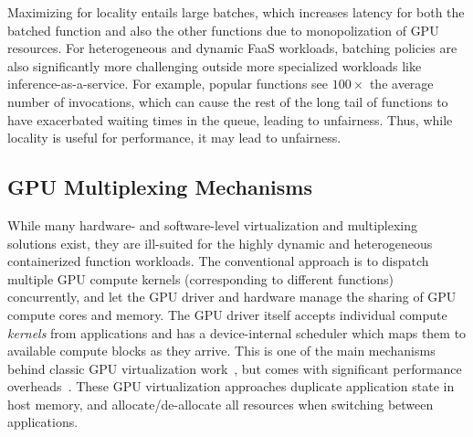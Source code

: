 Maximizing for locality entails large batches, which increases latency for both the batched function and also the other functions due to monopolization of GPU resources.  
For heterogeneous and dynamic FaaS workloads, batching policies are also significantly more challenging outside more specialized workloads like inference-as-a-service.
For example, popular functions see $100\times$ the average number of invocations, which can cause the rest of the long tail of functions to have exacerbated waiting times in the queue, leading to unfairness. 
Thus, while locality is useful for performance, it may lead to unfairness. 

\subsection{GPU Multiplexing Mechanisms}

While many hardware- and software-level virtualization and multiplexing solutions exist, they are ill-suited for the highly dynamic and heterogeneous containerized function workloads.
The conventional approach is to dispatch multiple GPU compute kernels (corresponding to different functions) concurrently, and let the GPU driver and hardware manage the sharing of GPU compute cores and memory.
The GPU driver itself accepts individual compute \emph{kernels} from applications and has a device-internal scheduler which maps them to available compute blocks as they arrive. 
This is one of the main mechanisms behind classic GPU virtualization work~\cite{duato2010rcuda, yu2019automatic, hong2017gpu}, but comes with significant performance overheads~\cite{yu2017full}. 
These GPU virtualization approaches duplicate application state in host memory, and allocate/de-allocate all resources when switching between applications. 


